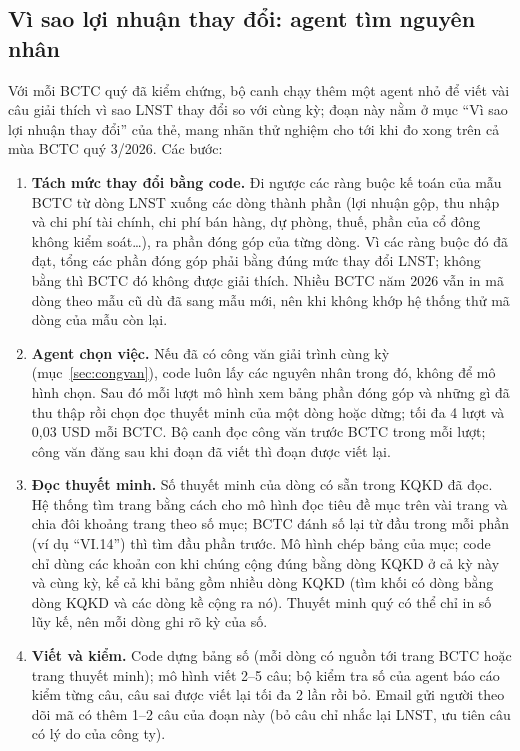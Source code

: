 \documentclass[12pt,a4paper]{report}
\newcommand{\enquote}[1]{“#1”}
\begin{document}
\subsection{Vì sao lợi nhuận thay đổi: agent tìm nguyên nhân}\label{sec:nguyennhan}
Với mỗi BCTC quý đã kiểm chứng, bộ canh chạy thêm một agent nhỏ để viết vài câu giải thích vì sao LNST thay đổi so với
cùng kỳ; đoạn này nằm ở mục \enquote{Vì sao lợi nhuận thay đổi} của thẻ, mang nhãn thử nghiệm cho tới khi đo xong
trên cả mùa BCTC quý 3/2026. Các bước:
\begin{enumerate}
  \item \textbf{Tách mức thay đổi bằng code.} Đi ngược các ràng buộc kế toán của mẫu BCTC từ dòng LNST xuống các dòng
        thành phần (lợi nhuận gộp, thu nhập và chi phí tài chính, chi phí bán hàng, dự phòng, thuế, phần của cổ đông
        không kiểm soát\ldots), ra phần đóng góp của từng dòng. Vì các ràng buộc đó đã đạt, tổng các phần đóng góp phải
        bằng đúng mức thay đổi LNST; không bằng thì BCTC đó không được giải thích. Nhiều BCTC năm 2026 vẫn in mã dòng
        theo mẫu cũ dù đã sang mẫu mới, nên khi không khớp hệ thống thử mã dòng của mẫu còn lại.
  \item \textbf{Agent chọn việc.} Nếu đã có công văn giải trình cùng kỳ (mục~\ref{sec:congvan}), code luôn lấy các
        nguyên nhân trong đó, không để mô hình chọn. Sau đó mỗi lượt mô hình xem bảng phần đóng góp và những gì đã thu
        thập rồi chọn đọc thuyết minh của một dòng hoặc dừng; tối đa 4 lượt và 0,03 USD mỗi BCTC. Bộ canh đọc công văn
        trước BCTC trong mỗi lượt; công văn đăng sau khi đoạn đã viết thì đoạn được viết lại.
  \item \textbf{Đọc thuyết minh.} Số thuyết minh của dòng có sẵn trong KQKD đã đọc. Hệ thống tìm trang bằng cách cho mô
        hình đọc tiêu đề mục trên vài trang và chia đôi khoảng trang theo số mục; BCTC đánh số lại từ đầu trong mỗi
        phần (ví dụ \enquote{VI.14}) thì tìm đầu phần trước. Mô hình chép bảng của mục; code chỉ dùng các khoản con khi
        chúng cộng đúng bằng dòng KQKD ở cả kỳ này và cùng kỳ, kể cả khi bảng gồm nhiều dòng KQKD (tìm khối có dòng
        bằng dòng KQKD và các dòng kề cộng ra nó). Thuyết minh quý có thể chỉ in số lũy kế, nên mỗi dòng ghi rõ kỳ của số.
  \item \textbf{Viết và kiểm.} Code dựng bảng số (mỗi dòng có nguồn tới trang BCTC hoặc trang thuyết minh); mô hình viết
        2--5 câu; bộ kiểm tra số của agent báo cáo kiểm từng câu, câu sai được viết lại tối đa 2 lần rồi bỏ. Email gửi
        người theo dõi mã có thêm 1--2 câu của đoạn này (bỏ câu chỉ nhắc lại LNST, ưu tiên câu có lý do của công ty).
\end{enumerate}
\end{document}
